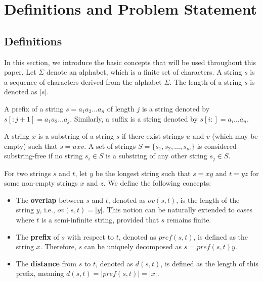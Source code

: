 \section{Definitions and Problem Statement}

\subsection{Definitions}
In this section, we introduce the basic concepts that will be used throughout
this paper. Let $\Sigma$ denote an alphabet, which is a finite set of
characters. A string $s$ is a sequence of characters derived from the alphabet
$\Sigma$. The length of a string $s$ is denoted as $|s|$.

\begin{definition}
A prefix of a string $s = a_1 a_2 \dots a_n$ of length $j$ is a string denoted
by $s[:j+1] = a_1 a_2 \dots a_j$. Similarly, a suffix is a string denoted by
$s[i:] = a_i \dots a_n$.
\end{definition}

\begin{definition}
A string $x$ is a substring of a string $s$ if there exist strings $u$ and $v$
(which may be empty) such that $s = uxv$. A set of strings $S = \{s_1, s_2,
\dots, s_m\}$ is considered substring-free if no string $s_i \in S$ is a
substring of any other string $s_j \in S$.
\end{definition}

\begin{definition}
For two strings $s$ and $t$, let $y$ be the longest string such that $s = xy$
and $t = yz$ for some non-empty strings $x$ and $z$. We define the following
concepts:
\begin{itemize}
    \item The \textbf{overlap} between $s$ and $t$, denoted as $ov(s, t)$, is
    the length of the string $y$, i.e., $ov(s,t) = |y|$. This notion can be
    naturally extended to cases where $t$ is a semi-infinite string, provided
    that $s$ remains finite.
    \item The \textbf{prefix} of $s$ with respect to $t$, denoted as
    $\textit{pref}(s, t)$, is defined as the string $x$. Therefore, $s$ can be
    uniquely decomposed as $s = \textit{pref}(s,t) y$.
    \item The \textbf{distance} from $s$ to $t$, denoted as $d(s, t)$, is
    defined as the length of this prefix, meaning $d(s, t) = |\textit{pref}(s,
    t)| = |x|$.
\end{itemize}
\end{definition}

